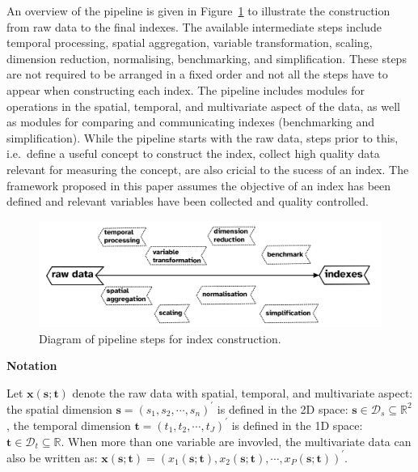 \documentclass[
]{article}
\begin{document}
An overview of the pipeline is given in Figure~\ref{fig-pipeline-steps}
to illustrate the construction from raw data to the final indexes. The
available intermediate steps include temporal processing, spatial
aggregation, variable transformation, scaling, dimension reduction,
normalising, benchmarking, and simplification. These steps are not
required to be arranged in a fixed order and not all the steps have to
appear when constructing each index. The pipeline includes modules for
operations in the spatial, temporal, and multivariate aspect of the
data, as well as modules for comparing and communicating indexes
(benchmarking and simplification). While the pipeline starts with the
raw data, steps prior to this, i.e.~define a useful concept to construct
the index, collect high quality data relevant for measuring the concept,
are also cricial to the sucess of an index. The framework proposed in
this paper assumes the objective of an index has been defined and
relevant variables have been collected and quality controlled.

\begin{figure}

{\centering \includegraphics[width=1\textwidth,height=0.9\textheight]{../figures/pipeline-steps.png}

}

\caption{\label{fig-pipeline-steps}Diagram of pipeline steps for index
construction.}

\end{figure}

\textbf{Notation}

Let \(\mathbf{x}(\mathbf{s};\mathbf{t})\) denote the raw data with
spatial, temporal, and multivariate aspect: the spatial dimension
\(\mathbf{s} = (s_1, s_2, \cdots, s_n)^\prime\) is defined in the 2D
space: \(\mathbf{s} \in \mathcal{D}_s \subseteq \mathbb{R}^2\), the
temporal dimension \(\mathbf{t} = (t_1, t_2, \cdots, t_J)^\prime\) is
defined in the 1D space:
\(\mathbf{t} \in \mathcal{D}_t \subseteq \mathbb{R}\). When more than
one variable are invovled, the multivariate data can also be written as:
\(\mathbf{x}(\mathbf{s}; \mathbf{t}) = (x_1(\mathbf{s}; \mathbf{t}), x_2(\mathbf{s}; \mathbf{t}), \cdots, x_P(\mathbf{s}; \mathbf{t}))^\prime\).
\end{document}
